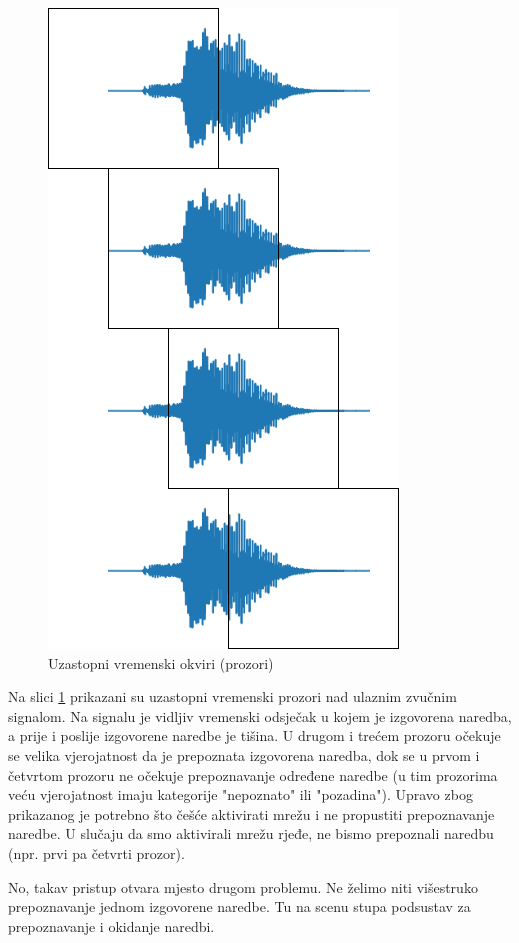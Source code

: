 \begin{figure}[htb]
    \centering
    \includegraphics[width=0.4\linewidth]{Chapters/struktura_sustava/aktivacija_nn/timeline.png}
    \caption{Uzastopni vremenski okviri (prozori) \cite{flowchart}}
    \label{pic:timeline}
\end{figure}

Na slici \ref{pic:timeline} prikazani su uzastopni vremenski prozori nad ulaznim zvučnim signalom.
Na signalu je vidljiv vremenski odsječak u kojem je izgovorena naredba, a prije i poslije
izgovorene naredbe je tišina. U drugom i trećem prozoru očekuje se velika vjerojatnost da 
je prepoznata izgovorena naredba, dok se u prvom i četvrtom prozoru ne očekuje prepoznavanje
određene naredbe (u tim prozorima veću vjerojatnost imaju kategorije "nepoznato" ili "pozadina").
Upravo zbog prikazanog je potrebno što češće aktivirati mrežu i ne propustiti prepoznavanje naredbe. 
U slučaju da smo aktivirali mrežu rjeđe, ne bismo prepoznali naredbu (npr. prvi pa četvrti
prozor). 

No, takav pristup otvara mjesto drugom problemu. Ne želimo niti višestruko prepoznavanje
jednom izgovorene naredbe. Tu na scenu stupa podsustav za prepoznavanje i okidanje naredbi.